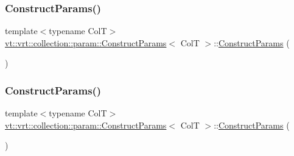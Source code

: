 \mbox{\label{structvt_1_1vrt_1_1collection_1_1param_1_1_construct_params_a0ea4f0b3c357c821f2de1147b40b8406}} 
\subsubsection{\texorpdfstring{Construct\+Params()}{ConstructParams()}\hspace{0.1cm}{\footnotesize\ttfamily [2/4]}}
{\footnotesize\ttfamily template$<$typename ColT$>$ \\
\hyperlink{structvt_1_1vrt_1_1collection_1_1param_1_1_construct_params}{vt\+::vrt\+::collection\+::param\+::\+Construct\+Params}$<$ ColT $>$\+::\hyperlink{structvt_1_1vrt_1_1collection_1_1param_1_1_construct_params}{Construct\+Params} (\begin{DoxyParamCaption}{ }\end{DoxyParamCaption})\hspace{0.3cm}{\ttfamily [default]}}

\mbox{\label{structvt_1_1vrt_1_1collection_1_1param_1_1_construct_params_ab64595f80b2c21decb1052b8182bc065}} 
\subsubsection{\texorpdfstring{Construct\+Params()}{ConstructParams()}\hspace{0.1cm}{\footnotesize\ttfamily [3/4]}}
{\footnotesize\ttfamily template$<$typename ColT$>$ \\
\hyperlink{structvt_1_1vrt_1_1collection_1_1param_1_1_construct_params}{vt\+::vrt\+::collection\+::param\+::\+Construct\+Params}$<$ ColT $>$\+::\hyperlink{structvt_1_1vrt_1_1collection_1_1param_1_1_construct_params}{Construct\+Params} (\begin{DoxyParamCaption}\item[{\hyperlink{structvt_1_1vrt_1_1collection_1_1param_1_1_construct_params}{Construct\+Params}$<$ ColT $>$ \&\&}]{ }\end{DoxyParamCaption})\hspace{0.3cm}{\ttfamily [default]}}

